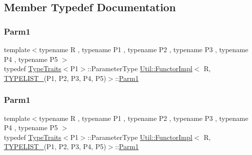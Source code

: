 \subsection{Member Typedef Documentation}
\mbox{\label{classUtil_1_1FunctorImpl_3_01R_00_01TYPELIST__5_07P1_00_01P2_00_01P3_00_01P4_00_01P5_08_4_abeccc1e3199db67f0637ce1fc9b08a32}} 
\subsubsection{\texorpdfstring{Parm1}{Parm1}\hspace{0.1cm}{\footnotesize\ttfamily [1/3]}}
{\footnotesize\ttfamily template$<$typename R , typename P1 , typename P2 , typename P3 , typename P4 , typename P5 $>$ \\
typedef \mbox{\hyperlink{classUtil_1_1TypeTraits}{Type\+Traits}}$<$P1$>$\+::Parameter\+Type \mbox{\hyperlink{classUtil_1_1FunctorImpl}{Util\+::\+Functor\+Impl}}$<$ R, \mbox{\hyperlink{adat__devel__install_2include_2adat_2typelist_8h_aad5d9b3c82c8503c85c625acd41c0a2f}{T\+Y\+P\+E\+L\+I\+S\+T\+\_}}(P1, P2, P3, P4, P5)$>$\+::\mbox{\hyperlink{structUtil_1_1Private_1_1FunctorImplBase_a9d61e693d6c616dea5bd9d9073c7d21a}{Parm1}}}

\mbox{\label{classUtil_1_1FunctorImpl_3_01R_00_01TYPELIST__5_07P1_00_01P2_00_01P3_00_01P4_00_01P5_08_4_abeccc1e3199db67f0637ce1fc9b08a32}} 
\subsubsection{\texorpdfstring{Parm1}{Parm1}\hspace{0.1cm}{\footnotesize\ttfamily [2/3]}}
{\footnotesize\ttfamily template$<$typename R , typename P1 , typename P2 , typename P3 , typename P4 , typename P5 $>$ \\
typedef \mbox{\hyperlink{classUtil_1_1TypeTraits}{Type\+Traits}}$<$P1$>$\+::Parameter\+Type \mbox{\hyperlink{classUtil_1_1FunctorImpl}{Util\+::\+Functor\+Impl}}$<$ R, \mbox{\hyperlink{adat__devel__install_2include_2adat_2typelist_8h_aad5d9b3c82c8503c85c625acd41c0a2f}{T\+Y\+P\+E\+L\+I\+S\+T\+\_}}(P1, P2, P3, P4, P5)$>$\+::\mbox{\hyperlink{structUtil_1_1Private_1_1FunctorImplBase_a9d61e693d6c616dea5bd9d9073c7d21a}{Parm1}}}

